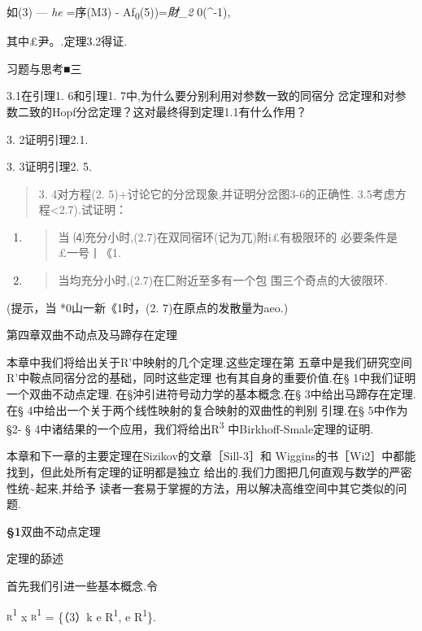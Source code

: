 \documentclass{article}
\begin{document}
如(3) --- \emph{he} =序(M3) - Af\textsubscript{0}(5))=\emph{財\_2}
0(\^{}-1),

其中£尹。.定理3.2得证.\textbar{}

\protect\hypertarget{bookmark157}{}{}习题与思考■三

3.1在引理1. 6和引理1. 7中,为什么要分别利用对参数一致的同宿分
岔定理和对参数二致的Hopf分岔定理？这对最终得到定理1.1有什么作用？

3. 2证明引理2.1.

3. 3证明引理2. 5.

\begin{quote}
3. 4对方程(2. 5)+讨论它的分岔现象,并证明分岔图3-6的正确性.
3.5考虑方程\textless{}2.7).试证明：
\end{quote}

\begin{enumerate}
\def\labelenumi{(\arabic{enumi})}
\item
  \begin{quote}
  当 ⑷充分小时,(2.7)在双同宿环(记为兀)附i£有极限环的
  必要条件是\textbar{}£一号丨《1.
  \end{quote}
\item
  \begin{quote}
  当均充分小时,(2.7)在匚附近至多有一个包 围三个奇点的大彼限环.
  \end{quote}
\end{enumerate}

(提示，当 *0山一新《1时，(2. 7)在原点的发散量为aeo.)

第四章双曲不动点及马蹄存在定理

本章中我们将给出关于R'中映射的几个定理.这些定理在第
五章中是我们研究空间R'中鞍点同宿分岔的基础，同时这些定理
也有其自身的重要价值.在§ 1中我们证明一个双曲不动点定理.
在§沖引进符号动力学的基本概念.在§ 3中给出马蹄存在定理. 在§
4中给出一个关于两个线性映射的复合映射的双曲性的判别 引理.在§ 5中作为§2-
§ 4中诸结果的一个应用，我们将给出R\textsuperscript{3}
中Birkhoff-Smale定理的证明.

本章和下一章的主要定理在Sizikov的文章［Sill-3］和
Wiggins的书［Wi2］中都能找到，但此处所有定理的证明都是独立
给出的.我们力图把几何直观与数学的严密性统\textasciitilde{}起来,并给予
读者一套易于掌握的方法，用以解决高维空间中其它类似的问题.

\protect\hypertarget{bookmark162}{}{}\textbf{§1}双曲不动点定理

定理的舔述

首先我们引进一些基本概念.令

\textsc{r\textsuperscript{1}} x \textsc{r\textsuperscript{1}} = \{（3）k
e R\textsuperscript{1}, e R\textsuperscript{1}\}.
\end{document}
